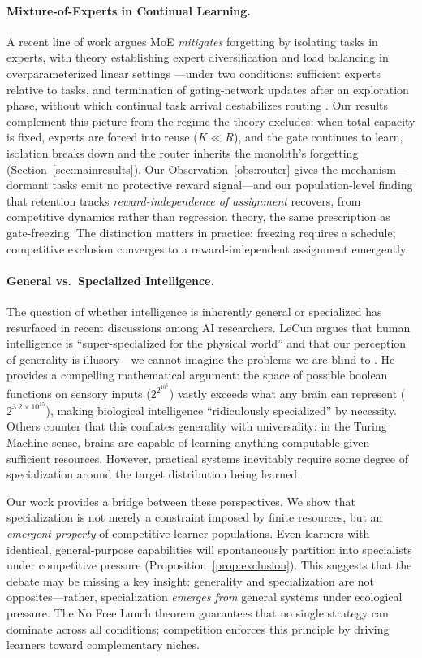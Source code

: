 \documentclass{article}
\begin{document}
\paragraph{Mixture-of-Experts in Continual Learning.}
A recent line of work argues MoE \emph{mitigates} forgetting by isolating tasks in
experts, with theory establishing expert diversification and load balancing in
overparameterized linear settings \cite{li2024moecl}---under two conditions:
sufficient experts relative to tasks, and termination of gating-network updates
after an exploration phase, without which continual task arrival destabilizes
routing \cite{li2024moecl}. Our results complement this picture from the regime
the theory excludes: when total capacity is fixed, experts are forced into reuse
($K \ll R$), and the gate continues to learn, isolation breaks down and the
router inherits the monolith's forgetting
(Section~\ref{sec:mainresults}). Our Observation~\ref{obs:router} gives the
mechanism---dormant tasks emit no protective reward signal---and our
population-level finding that retention tracks \emph{reward-independence of
assignment} recovers, from competitive dynamics rather than regression theory,
the same prescription as gate-freezing. The distinction matters in practice:
freezing requires a schedule; competitive exclusion converges to a
reward-independent assignment emergently.

\paragraph{General vs.\ Specialized Intelligence.}
The question of whether intelligence is inherently general or specialized has resurfaced in recent discussions among AI researchers. LeCun argues that human intelligence is ``super-specialized for the physical world'' and that our perception of generality is illusory---we cannot imagine the problems we are blind to \cite{lecun2022path}. He provides a compelling mathematical argument: the space of possible boolean functions on sensory inputs ($2^{2^{10^6}}$) vastly exceeds what any brain can represent ($2^{3.2 \times 10^{15}}$), making biological intelligence ``ridiculously specialized'' by necessity. Others counter that this conflates generality with universality: in the Turing Machine sense, brains are capable of learning anything computable given sufficient resources. However, practical systems inevitably require some degree of specialization around the target distribution being learned.

Our work provides a bridge between these perspectives. We show that specialization is not merely a constraint imposed by finite resources, but an \textit{emergent property} of competitive learner populations. Even learners with identical, general-purpose capabilities will spontaneously partition into specialists under competitive pressure (Proposition~\ref{prop:exclusion}). This suggests that the debate may be missing a key insight: generality and specialization are not opposites---rather, specialization \textit{emerges from} general systems under ecological pressure. The No Free Lunch theorem guarantees that no single strategy can dominate across all conditions; competition enforces this principle by driving learners toward complementary niches.
\end{document}
